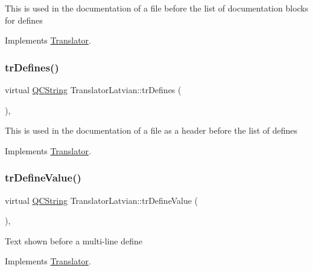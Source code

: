 This is used in the documentation of a file before the list of documentation blocks for defines 

Implements \mbox{\hyperlink{class_translator}{Translator}}.

\mbox{\label{class_translator_latvian_af867c5d6a1972bcf017763dcebf7f9ee}} 
\subsubsection{\texorpdfstring{trDefines()}{trDefines()}}
{\footnotesize\ttfamily virtual \mbox{\hyperlink{class_q_c_string}{Q\+C\+String}} Translator\+Latvian\+::tr\+Defines (\begin{DoxyParamCaption}{ }\end{DoxyParamCaption})\hspace{0.3cm}{\ttfamily [inline]}, {\ttfamily [virtual]}}

This is used in the documentation of a file as a header before the list of defines 

Implements \mbox{\hyperlink{class_translator}{Translator}}.

\mbox{\label{class_translator_latvian_a645dfdf558e7f0a2749ccff085fddce5}} 
\subsubsection{\texorpdfstring{trDefineValue()}{trDefineValue()}}
{\footnotesize\ttfamily virtual \mbox{\hyperlink{class_q_c_string}{Q\+C\+String}} Translator\+Latvian\+::tr\+Define\+Value (\begin{DoxyParamCaption}{ }\end{DoxyParamCaption})\hspace{0.3cm}{\ttfamily [inline]}, {\ttfamily [virtual]}}

Text shown before a multi-\/line define 

Implements \mbox{\hyperlink{class_translator}{Translator}}.

\mbox{\label{class_translator_latvian_aab81dcf029c6395e18f9716736441d32}} 

